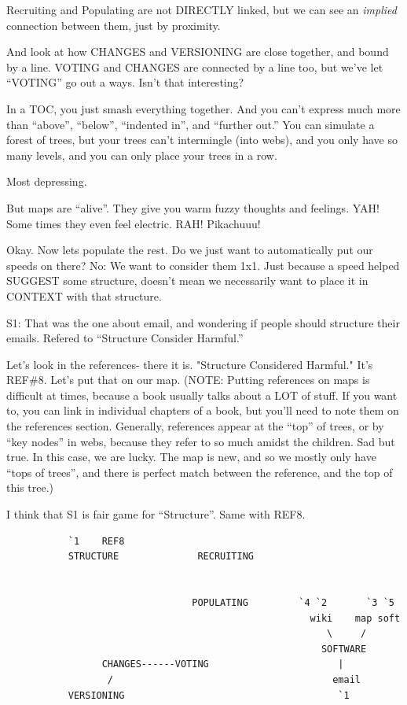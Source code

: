 \documentclass[oneside]{book}
\begin{document}
Recruiting and Populating are not DIRECTLY linked, but we can see an
\emph{implied} connection between them, just by proximity.

And look at how CHANGES and VERSIONING are close together, and bound
by a line. VOTING and CHANGES are connected by a line too, but we've
let ``VOTING'' go out a ways. Isn't that interesting?

In a TOC, you just smash everything together. And you can't express
much more than ``above'', ``below'', ``indented in'', and ``further out.'' You
can simulate a forest of trees, but your trees can't intermingle (into
webs), and you only have so many levels, and you can only place your
trees in a row.

Most depressing.

But maps are ``alive''. They give you warm fuzzy thoughts and
feelings. YAH! Some times they even feel electric. RAH! Pikachuuu!

Okay. Now lets populate the rest. Do we just want to automatically put
our speeds on there? No: We want to consider them 1x1. Just because a
speed helped SUGGEST some structure, doesn't mean we necessarily want
to place it in CONTEXT with that structure.

S1: That was the one about email, and wondering if people should
    structure their emails. Refered to ``Structure Consider Harmful.''

Let's look in the references- there it is. "Structure Considered
Harmful." It's REF\#8. Let's put that on our map. (NOTE: Putting
references on maps is difficult at times, because a book usually talks
about a LOT of stuff. If you want to, you can link in individual
chapters of a book, but you'll need to note them on the references
section. Generally, references appear at the ``top'' of trees, or by
``key nodes'' in webs, because they refer to so much amidst the
children. Sad but true. In this case, we are lucky. The map is new,
and so we mostly only have ``tops of trees'', and there is perfect match
between the reference, and the top of this tree.)

I think that S1 is fair game for ``Structure''. Same with REF8.

\begin{verbatim}
           `1    REF8
           STRUCTURE              RECRUITING


                                 POPULATING         `4 `2       `3 `5
                                                      wiki    map soft
                                                         \     /
                                                        SOFTWARE
                 CHANGES------VOTING                       |
                  /                                       email
           VERSIONING                                      `1
\end{verbatim}
\end{document}
